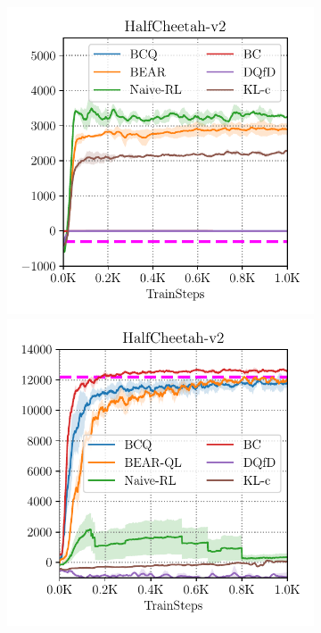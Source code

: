 \begin{figure}
    \centering
    \begin{subfigure}[t]{0.23\textwidth}
        \centering
        \includegraphics[width=0.99\linewidth]{chapters/bear/images/images_camera_ready/cheetah_random_final_camera_ready.pdf}
        \includegraphics[width=0.99\linewidth]{chapters/bear/images/images_camera_ready/cheetah_optimal_camera_ready_new.pdf}

\end{subfigure}
\end{figure}
